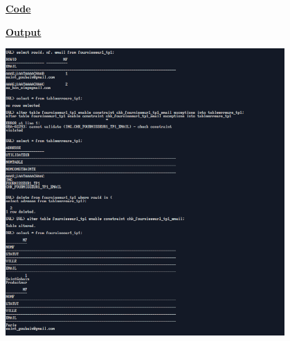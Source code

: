 \newpage
{}

\textbf{\underline{Code}}


\newpage
\textbf{\underline{Output}}
\vspace{1cm}
\begin{center}
    \includegraphics[width=0.8\textwidth]{Questions/q47/q47.png}
\end{center}

